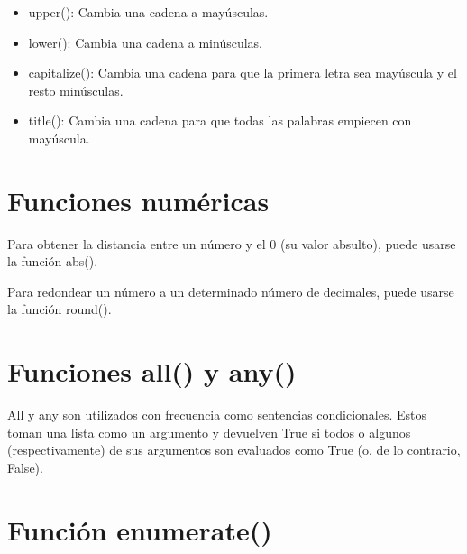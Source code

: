 \documentclass{report}
\begin{document}
{\begin{itemize}

  \item upper(): Cambia una cadena a mayúsculas.
  

  \item lower(): Cambia una cadena a minúsculas.
  

  \item capitalize(): Cambia una cadena para que la primera letra sea mayúscula y el resto minúsculas.

  
  \item title(): Cambia una cadena para que todas las palabras empiecen con mayúscula.
  

\end{itemize}

\section{Funciones numéricas}

Para obtener la distancia entre un número y el 0 (su valor absulto), puede usarse la función abs().


Para redondear un número a un determinado número de decimales, puede usarse la función round().


\section{Funciones all() y any()}

All y any son utilizados con frecuencia como sentencias condicionales. Estos toman una lista como un argumento y devuelven True si todos o algunos (respectivamente) de sus argumentos son evaluados como True (o, de lo contrario, False).



\section{Función enumerate()}

}
\end{document}
